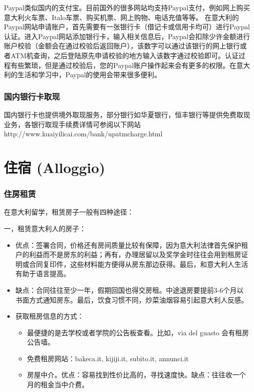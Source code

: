 Paypal类似国内的支付宝。目前国外的很多网站均支持Paypal支付，例如网上购买意大利火车票、Italo车票、购买机票、网上购物、电话充值等等。
在意大利的Paypal网站申请账户，首先需要有一张银行卡（借记卡或信用卡均可）进行Paypal认证。进入Paypal网站添加银行卡，输入相关信息后，Paypal会扣除少许金额进行账户校验（金额会在通过校验后返回账户），该数字可以通过该银行的网上银行或者ATM机查询，之后登陆原先申请校验的地方输入该数字通过校验即可。认证过程有些繁琐，但是通过校验后，您的Paypal账户操作起来会有更多的权限。在意大利的生活和学习中，Paypal的使用会带来很多便利。

\subsubsection{国内银行卡取现}
国内银行卡也提供境外取现服务，部分银行如华夏银行，恒丰银行等提供免费取现业务，各银行取现手续费详情可参阅以下网站
 http://www.kuaiyilicai.com/bank/upatmcharge.html

\section{住宿 (Alloggio)}
\subsubsection{住房租赁}

在意大利留学，租赁房子一般有四种途径：

一，租赁意大利人的房子：
\begin{itemize} 
\item 优点：签署合同，价格还有房间质量比较有保障，因为意大利法律首先保护租户的利益而不是房东的利益；再有，办理居留以及奖学金时往往会用到租房证明或合同复印件，这些材料能方便得从房东那边获得。最后，和意大利人生活有助于语言提高。
\item 缺点：合同往往至少一年，假期回国也得交房租。中途退房要提前3-6个月以书面方式通知房东。最后，饮食习惯不同，炒菜油烟容易引起意大利人反感。
\item 获取租房信息的方式：
\begin{itemize}
	\item 最便捷的是去学校或者学院的公告板查看。比如，via del guasto 会有租房公告墙。
	\item 免费租房网站：bakeca.it, kijiji.it,  subito.it, annunci.it
	\item 房屋中介。优点：容易找到性价比高的，寻找速度快。缺点：往往收一个月的租金当中介费。
\end{itemize} 
\end{itemize} 

